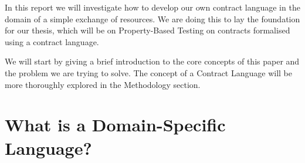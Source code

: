 \documentclass{ituthesis}
\begin{document}

%
In this report we will investigate how to develop our own contract language in the domain of a simple exchange of resources. We are doing this to lay the foundation for our thesis, which will be on Property-Based Testing on contracts formalised using a contract language.

We will start by giving a brief introduction to the core concepts of this paper and the problem we are trying to solve. The concept of a Contract Language will be more thoroughly explored in the Methodology section.

\section{What is a Domain-Specific Language?}
\end{document}

